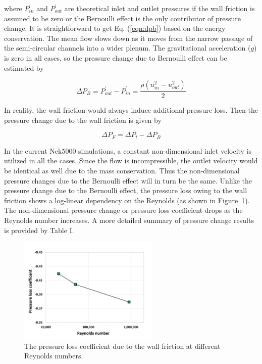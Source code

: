 where $P^\prime_{in}$ and $P^\prime_{out}$ are theoretical inlet and outlet pressures if the wall friction is assumed to be zero or the Bernoulli effect is the only contributor of pressure change. It is straightforward to get Eq. (\ref{eqn:dpb}) based on the energy conservation. The mean flow slows down as it moves from the narrow passage of the semi-circular channels into a wider plenum. The gravitational acceleration ($g$) is zero in all cases, so the pressure change due to Bernoulli effect can be estimated by 

\begin{equation}
\label{eqn:dpb}
    \Delta P_B = P^\prime_{out} - P^\prime_{in} = \frac{\rho ( u_{in}^2 - u_{out}^2 )}{2} 
\end{equation}

In reality, the wall friction would always induce additional pressure loss. Then the pressure change due to the wall friction is given by 

\begin{equation}
    \Delta P_F =  \Delta P_t -\Delta P_B
\end{equation}

In the current Nek5000 simulations, a constant non-dimensional inlet velocity is utilized in all the cases. Since the flow is incompressible, the outlet velocity would be identical as well due to the mass conservation. Thus the non-dimensional pressure changes due to the Bernoulli effect will in turn be the same. Unlike the pressure change due to the Bernoulli effect, the pressure loss owing to the wall friction shows a log-linear dependency on the Reynolds (as shown in Figure~\ref{fig:pressure_loss}). The non-dimensional pressure change or pressure loss coefficient drops as the Reynolds number increases. A more detailed summary of pressure change results is provided by Table I. 


\begin{figure}[!ht]
\centering
\includegraphics[width=0.6\textwidth]{./figures/pressure_loss.png}
\caption{The pressure loss coefficient due to the wall friction at different Reynolds numbers. }
\label{fig:pressure_loss}
\end{figure}

